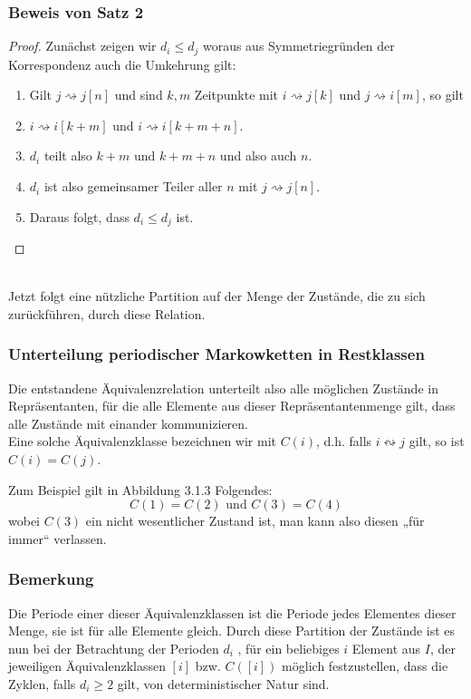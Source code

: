\documentclass[a4paper]{article}
\begin{document}
\subsubsection{Beweis von Satz 2}
\begin{proof}
Zunächst zeigen wir $d_i \leq d_j$ woraus aus Symmetriegründen der Korrespondenz auch die
Umkehrung gilt:
\\

	\begin{enumerate}
		\item Gilt $j \rightsquigarrow j[n]$ und sind $k, m$ Zeitpunkte mit 
			$i \rightsquigarrow j [k]$ und $j \rightsquigarrow i [m]$, so gilt
		\item $i \rightsquigarrow i [k+m]$ und $i \rightsquigarrow i [k+m+n]$.
		\item $d_i$ teilt also $k+m$ und $k+m+n$ und also auch $n$. 
		\item $d_i$ ist also gemeinsamer Teiler aller $n$ mit 
			$j \rightsquigarrow j [n]$. 
		\item Daraus folgt, dass $d_i \leq d_j$ ist.
	\end{enumerate}
\end{proof}
\\

Jetzt folgt eine nützliche Partition auf der Menge der Zustände, die zu sich zurückführen, durch diese
Relation.

\subsubsection{Unterteilung periodischer Markowketten in Restklassen}

Die entstandene Äquivalenzrelation unterteilt also alle möglichen Zustände in
Repräsentanten, für die alle Elemente aus dieser Repräsentantenmenge gilt, dass alle Zustände mit
einander kommunizieren.
\\

Eine solche Äquivalenzklasse bezeichnen wir mit $C(i)$, d.h. falls $i \leftrightsquigarrow j$ gilt, so ist $C(i)=C(j)$.

Zum Beispiel gilt in Abbildung 3.1.3 Folgendes: 
\[
	C(1) = C(2) \text{ und } C(3) = C(4)
\] 
wobei $C (3)$ ein nicht wesentlicher
Zustand ist, man kann also diesen „für immer“ verlassen.
\\

\subsubsection{Bemerkung}
Die Periode einer dieser Äquivalenzklassen ist die Periode jedes Elementes dieser Menge, sie ist für alle
Elemente gleich.
Durch diese Partition der Zustände ist es nun bei der Betrachtung der Perioden $d_i$ , für ein beliebiges $i$
Element aus $I$, der jeweiligen Äquivalenzklassen $[i]$ bzw. $C([i])$ möglich festzustellen, dass die
Zyklen, falls $d_i \geq 2$ gilt, von deterministischer Natur sind.
\\
\end{document}
